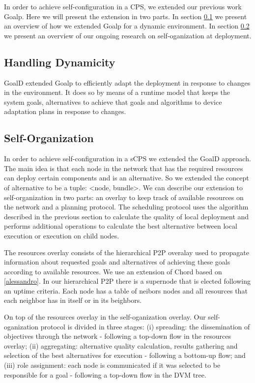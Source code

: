 \documentclass[conference]{IEEEtran}
\begin{document}
In order to achieve self-configuration in a CPS, we extended our previous work Goalp. Here we will present the extension in two parts. In section \ref{handling_dynamicity} we present an overview of how we extended Goalp for a dynamic environment\cite{rodrigues_goald:_2019}. In section \ref{self_organization} we present an overview of our ongoing research on self-oganization at deployment. 

\subsection{Handling Dynamicity}
\label{handling_dynamicity}

GoalD extended Goalp to efficiently adapt the deployment in response to changes in the environment. It does so by means of a runtime model that keeps the system goals, alternatives to achieve that goals and algorithms to device adaptation plans in response to changes.




\subsection{Self-Organization}
\label{self_organization}

In order to achieve self-configuration in a sCPS we extended the GoalD approach. The main idea is that each node in the network that has the required resources can deploy certain components and is an alternative. So we extended the concept of alternative to be a tuple: <node, bundle>. We can describe our extension to self-organization in two parts: an overlay to keep track of available resources on the network and a planning protocol. The scheduling protocol uses the algorithm described in the previous section to calculate the quality of local deployment and performs additional operations to calculate the best alternative between local execution or execution on child nodes.

The resources overlay consists of the hierarchical P2P overalay used to propagate information about requested goals and alternatives of achieving these goals according to available resources. We use an extension of Chord based on \ref{alessandro}. In our hierarchical P2P there is a supernode that is elected following an uptime criteria. Each node has a table of neibors nodes and all resources that each neighbor has in itself or in its beighbors.


On top of the resources overlay in the self-oganization overlay. Our self-oganization protocol is divided in three stages: (i) spreading: the dissemination of objectives through the network - following a top-down flow in the resources overlay; (ii) aggregating: alternative quality calculation, results gathering and selection of the best alternatives for execution - following a bottom-up flow; and (iii) role assignment: each node is communicated if it was selected to be responsible for a goal - following a top-down flow in the DVM tree. 
\end{document}

